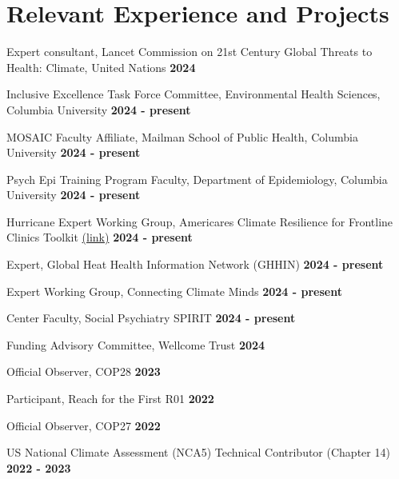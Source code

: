 \section*{Relevant Experience and Projects}

\noindent Expert consultant, Lancet Commission on 21st Century Global Threats to Health: Climate, United Nations \hfill \textbf{2024}

\noindent Inclusive Excellence Task Force Committee, Environmental Health Sciences, Columbia University \hfill \textbf{2024 - present}

\noindent MOSAIC Faculty Affiliate, Mailman School of Public Health, Columbia University \hfill \textbf{2024 - present}

\noindent Psych Epi Training Program Faculty, Department of Epidemiology, Columbia University \hfill \textbf{2024 - present}

\noindent Hurricane Expert Working Group, Americares Climate Resilience for Frontline Clinics Toolkit \href{https://www.americares.org/what-we-do/community-health/climate-resilient-health-clinics/#toolkit}{(link)} \hfill \textbf{2024 - present}

\noindent Expert, Global Heat Health Information Network (GHHIN) \hfill \textbf{2024 - present}

\noindent Expert Working Group, Connecting Climate Minds \hfill \textbf{2024 - present}

\noindent Center Faculty, Social Psychiatry SPIRIT \hfill \textbf{2024 - present}

\noindent Funding Advisory Committee, Wellcome Trust \hfill \textbf{2024}

\noindent Official Observer, COP28 \hfill \textbf{2023}

\noindent Participant, Reach for the First R01 \hfill \textbf{2022}

\noindent Official Observer, COP27 \hfill \textbf{2022}

\noindent US National Climate Assessment (NCA5) Technical Contributor (Chapter 14) \hfill \textbf{2022 - 2023}


